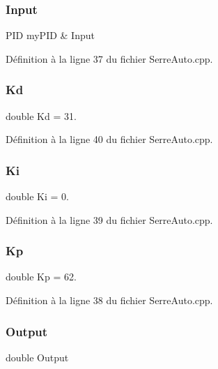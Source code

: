 \mbox{\label{_serre_auto_8cpp_a1650ded891a8683614e014008c96278c}} 
\subsubsection{Input}
{\footnotesize\ttfamily P\+ID my\+P\+ID \& Input}



Définition à la ligne 37 du fichier Serre\+Auto.\+cpp.

\mbox{\label{_serre_auto_8cpp_ab9e6bbb0361dc98bc2f5399d014c6c01}} 
\subsubsection{Kd}
{\footnotesize\ttfamily double Kd = 31.}



Définition à la ligne 40 du fichier Serre\+Auto.\+cpp.

\mbox{\label{_serre_auto_8cpp_aad5977a9e83736178f3b724a1d228652}} 
\subsubsection{Ki}
{\footnotesize\ttfamily double Ki = 0.}



Définition à la ligne 39 du fichier Serre\+Auto.\+cpp.

\mbox{\label{_serre_auto_8cpp_afd070d90e3f8bb3e9bb9c6dff310503b}} 
\subsubsection{Kp}
{\footnotesize\ttfamily double Kp = 62.}



Définition à la ligne 38 du fichier Serre\+Auto.\+cpp.

\mbox{\label{_serre_auto_8cpp_abe306616e5964581019974a7d94cffe2}} 
\subsubsection{Output}
{\footnotesize\ttfamily double Output}



